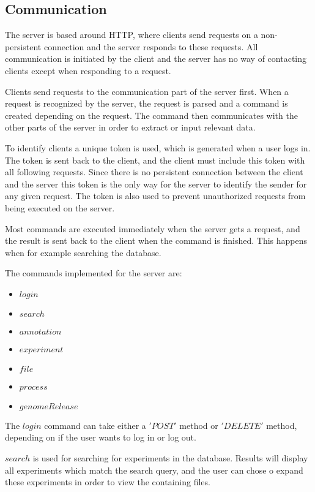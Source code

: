 \label{chap:com_systemdesign}
\subsection{Communication}
The server is based around HTTP, where clients send requests on a non-persistent connection and the server responds to these requests. All communication is initiated by the client and the server has no way of contacting clients except when responding to a request. 

Clients send requests to the communication part of the server first. When a request is recognized by the server, the request is parsed and a command is created depending on the request. The command then communicates with the other parts of the server in order to extract or input relevant data. 

To identify clients a unique token is used, which is generated when a user logs in. The token is sent back to the client, and the client must include this token with all following requests. Since there is no persistent connection between the client and the server this token is the only way for the server to identify the sender for any given request. The token is also used to prevent unauthorized requests from being executed on the server.

Most commands are executed immediately when the server gets a request, and the result is sent back to the client when the command is finished. This happens when for example searching the database. 

The commands implemented for the server are:

\begin{itemize}
	\item $login$
	\item $search$
	\item $annotation$
	\item $experiment$
	\item $file$
	\item $process$
	\item $genomeRelease$
\end{itemize}

The $login$ command can take either a $'POST'$ method or $'DELETE'$ method, depending on if the user wants to log in or log out. 

$search$ is used for searching for experiments in the database. Results will display all experiments which match the search query, and the user can chose o expand these experiments in order to view the containing files. 

